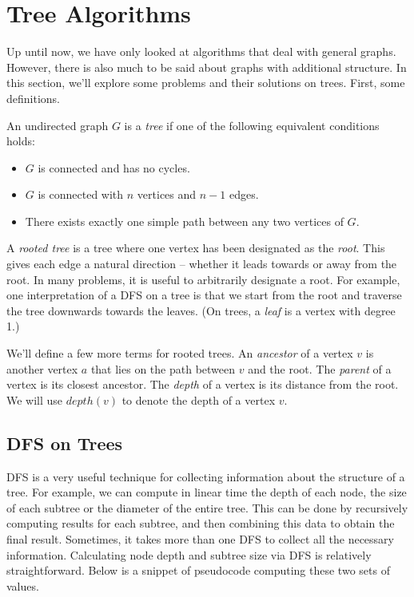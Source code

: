 \chapter{Tree Algorithms}

Up until now, we have only looked at algorithms that deal with general graphs. However, there is also much to be said about graphs with additional structure. In this section, we'll explore some problems and their solutions on trees. First, some definitions.

An undirected graph $G$ is a \emph{tree} if one of the following equivalent conditions holds: 
\begin{itemize}
\item
$G$ is connected and has no cycles.
\item
$G$ is connected with $n$ vertices and $n - 1$ edges.
\item
There exists exactly one simple path between any two vertices of $G$.
\end{itemize}
A \emph{rooted tree} is a tree where one vertex has been designated as the \emph{root}. This gives each edge a natural direction -- whether it leads towards or away from the root. In many problems, it is useful to arbitrarily designate a root. For example, one interpretation of a DFS on a tree is that we start from the root and traverse the tree downwards towards the leaves. (On trees, a \emph{leaf} is a vertex with degree 1.)

We'll define a few more terms for rooted trees. An \emph{ancestor} of a vertex $v$ is another vertex $a$ that lies on the path between $v$ and the root. The \emph{parent} of a vertex is its closest ancestor. The \emph{depth} of a vertex is its distance from the root. We will use $depth(v)$ to denote the depth of a vertex $v$.

\section{DFS on Trees}

DFS is a very useful technique for collecting information about the structure of a tree. For example, we can compute in linear time the depth of each node, the size of each subtree or the diameter of the entire tree. This can be done by recursively computing results for each subtree, and then combining this data to obtain the final result. Sometimes, it takes more than one DFS to collect all the necessary information. Calculating node depth and subtree size via DFS is relatively straightforward. Below is a snippet of pseudocode computing these two sets of values.

